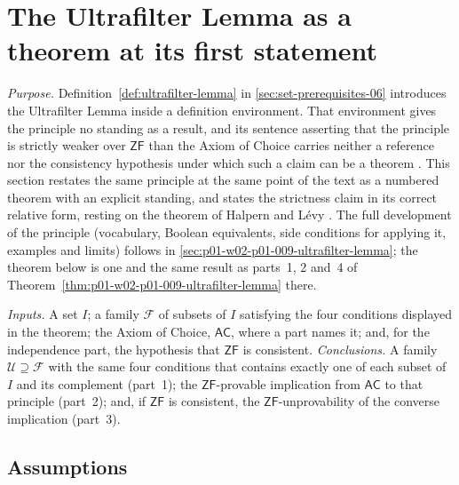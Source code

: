 \section{The Ultrafilter Lemma as a theorem at its first statement}
\label{sec:p01-w02b-p01-005-ultrafilter-lemma-entry}

\emph{Purpose.} Definition~\ref{def:ultrafilter-lemma} in
\cref{sec:set-prerequisites-06} introduces the Ultrafilter Lemma inside a
definition environment. That environment gives the principle no standing as a
result, and its sentence asserting that the principle is strictly weaker over
\(\mathsf{ZF}\) than the Axiom of Choice carries neither a reference nor the
consistency hypothesis under which such a claim can be a theorem
\cite[ch.~``Sets, Relations, Functions, and Cardinality'', sec.~``Choice
principles used later'', definition ``Ultrafilter Lemma'']{FrozenFormalLogicUltrafilterLemma}.
This section restates the same principle at the same point of the text as a
numbered theorem with an explicit standing, and states the strictness claim in
its correct relative form, resting on the theorem of Halpern and L\'evy
\cite{HalpernLevy1971}. The full development of the principle (vocabulary,
Boolean equivalents, side conditions for applying it, examples and limits)
follows in \cref{sec:p01-w02-p01-009-ultrafilter-lemma}; the theorem below is
one and the same result as parts~1, 2 and~4 of
Theorem~\ref{thm:p01-w02-p01-009-ultrafilter-lemma} there.

\emph{Inputs.} A set \(I\); a family \(\mathcal F\) of subsets of \(I\)
satisfying the four conditions displayed in the theorem; the Axiom of Choice,
\(\mathsf{AC}\), where a part names it; and, for the independence part, the
hypothesis that \(\mathsf{ZF}\) is consistent.
\emph{Conclusions.} A family \(\mathcal U\supseteq\mathcal F\) with the same
four conditions that contains exactly one of each subset of \(I\) and its
complement (part~1); the \(\mathsf{ZF}\)-provable implication from
\(\mathsf{AC}\) to that principle (part~2); and, if \(\mathsf{ZF}\) is
consistent, the \(\mathsf{ZF}\)-unprovability of the converse implication
(part~3).

\subsection{Assumptions}
\label{sec:p01-w02b-p01-005-assumptions}

